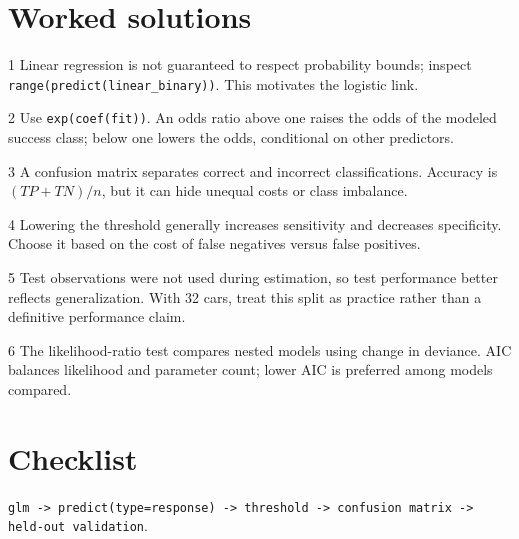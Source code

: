 \documentclass[11pt]{article}
\begin{document}
\section{Worked solutions}
\begin{answer}{1} Linear regression is not guaranteed to respect probability bounds; 
    \newline
    inspect \texttt{range(predict(linear\_binary))}. This motivates the logistic link.\end{answer}
\begin{answer}{2} Use \texttt{exp(coef(fit))}. An odds ratio above one raises the odds of the modeled success class; below one lowers the odds, conditional on other predictors.\end{answer}
\begin{answer}{3} A confusion matrix separates correct and incorrect classifications. Accuracy is $(TP+TN)/n$, but it can hide unequal costs or class imbalance.\end{answer}
\begin{answer}{4} Lowering the threshold generally increases sensitivity and decreases specificity. Choose it based on the cost of false negatives versus false positives.\end{answer}
\begin{answer}{5} Test observations were not used during estimation, so test performance better reflects generalization. With 32 cars, treat this split as practice rather than a definitive performance claim.\end{answer}
\begin{answer}{6} The likelihood-ratio test compares nested models using change in deviance. AIC balances likelihood and parameter count; lower AIC is preferred among models compared.\end{answer}
\section*{Checklist}\texttt{glm -> predict(type=response) -> threshold -> confusion matrix -> held-out validation}.
\end{document}
